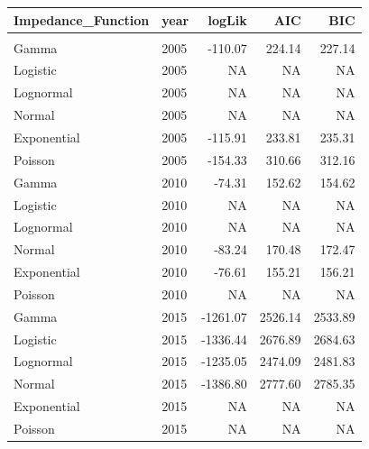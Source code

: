 \documentclass[
11pt, %
oneside, %
english, %
singlespacing, %
]{macthesis} %
\begin{document}
\begin{table}
\begin{tabular}{llrrr}
\toprule
Impedance\_Function & year & logLik & AIC & BIC\\
\midrule
\addlinespace[0.3em]
\multicolumn{5}{l}{\textbf{Destination: Outdoors }}\\
\hspace{1em}Gamma & 2005 & -110.07 & 224.14 & 227.14\\
\hspace{1em}Logistic & 2005 & NA & NA & NA\\
\hspace{1em}Lognormal & 2005 & NA & NA & NA\\
\hspace{1em}Normal & 2005 & NA & NA & NA\\
\hspace{1em}Exponential & 2005 & -115.91 & 233.81 & 235.31\\
\hspace{1em}Poisson & 2005 & -154.33 & 310.66 & 312.16\\
\hspace{1em}Gamma & 2010 & -74.31 & 152.62 & 154.62\\
\hspace{1em}Logistic & 2010 & NA & NA & NA\\
\hspace{1em}Lognormal & 2010 & NA & NA & NA\\
\hspace{1em}Normal & 2010 & -83.24 & 170.48 & 172.47\\
\hspace{1em}Exponential & 2010 & -76.61 & 155.21 & 156.21\\
\hspace{1em}Poisson & 2010 & NA & NA & NA\\
\hspace{1em}Gamma & 2015 & -1261.07 & 2526.14 & 2533.89\\
\hspace{1em}Logistic & 2015 & -1336.44 & 2676.89 & 2684.63\\
\hspace{1em}Lognormal & 2015 & -1235.05 & 2474.09 & 2481.83\\
\hspace{1em}Normal & 2015 & -1386.80 & 2777.60 & 2785.35\\
\hspace{1em}Exponential & 2015 & NA & NA & \vphantom{1} NA\\
\hspace{1em}Poisson & 2015 & NA & NA & \vphantom{1} NA\\

\end{tabular}
\end{table}
\end{document}
